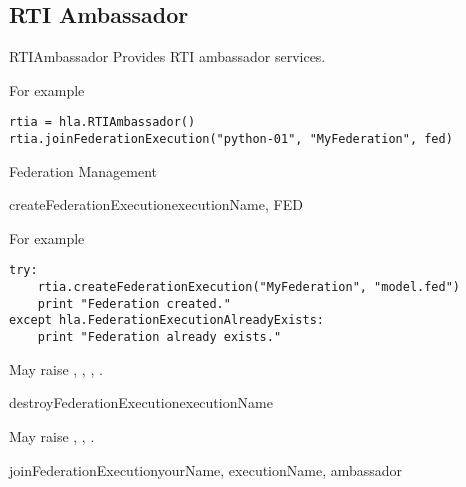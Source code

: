 \subsection{RTI Ambassador}

\begin{classdesc}{RTIAmbassador}{}
Provides RTI ambassador services.

For example
\begin{verbatim}
rtia = hla.RTIAmbassador()
rtia.joinFederationExecution("python-01", "MyFederation", fed)
\end{verbatim}

\begin{hlamsc}{Federation Management}

\nextlevel
{}
\nextlevel
{}
\nextlevel
{}
\nextlevel
{}
\nextlevel
{}
\nextlevel
{}
\nextlevel
{}
\nextlevel
{}
\nextlevel
{}
\nextlevel
\end{hlamsc}

\begin{methoddesc}{createFederationExecution}{executionName, FED}

For example
\begin{verbatim} 
try:
    rtia.createFederationExecution("MyFederation", "model.fed")
    print "Federation created."
except hla.FederationExecutionAlreadyExists:
    print "Federation already exists."
\end{verbatim}

May raise
,
,
,
.
\end{methoddesc}

\begin{methoddesc}{destroyFederationExecution}{executionName}

May raise
,
,
.
\end{methoddesc}

\begin{methoddesc}{joinFederationExecution}{yourName, executionName, ambassador}


\end{methoddesc}
\end{classdesc}
